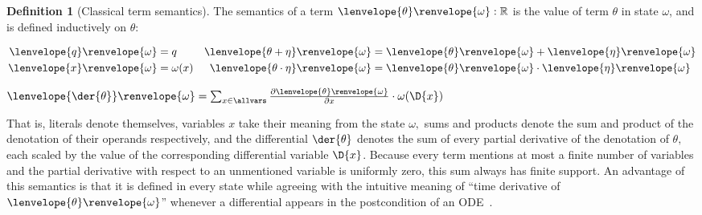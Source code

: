 \documentclass[12pt]{cmuthesis}
\theoremstyle{definition}
\newtheorem{definition}{Definition}
\theoremstyle{remark}
\newcommand{\om}{\omega}
\newcommand{\tint}[2]{\lenvelope{#1}\renvelope{#2}}
\begin{document}
\begin{definition}[Classical term semantics]\label{def:dgl-sem-term}
The semantics of a term $\tint{\theta}{\om} : \mathbb{R}$ is the value of term $\theta$ in state $\om$, and is defined inductively on $\theta$:

\begin{minipage}{0.5\textwidth}
\begin{align*}
  \tint{q}{\om} &= q      & \tint{\theta + \eta}{\om}     &= \tint{\theta}{\om} + \tint{\eta}{\om}   \\
  \tint{x}{\om} &= \om(x) & \tint{\theta \cdot \eta}{\om} &= \tint{\theta}{\om} \cdot \tint{\eta}{\om}
\end{align*}
\end{minipage}
\begin{minipage}{0.5\textwidth}
${\tint{\der{\theta}}{\om} = \sum_{x \in \allvars} \frac{\partial \tint{\theta}{\om}}{\partial x} \cdot \omega(\D{x})}$
\end{minipage}
\end{definition}
That is, literals denote themselves, variables $x$ take their meaning from the state $\om,$ sums and products denote the sum and product of the denotation of their operands respectively, and the differential $\der{\theta}$ denotes the sum of every partial derivative of the denotation of $\theta,$ each scaled by the value of the corresponding differential variable $\D{x}$.
Because every term mentions at most a finite number of variables and the partial derivative with respect to an unmentioned variable is uniformly zero, this sum always has finite support.
An advantage of this semantics is that it is defined in every state while agreeing with the intuitive meaning of ``time derivative of $\tint{\theta}{\om}$'' whenever a differential appears in the postcondition of an ODE~\cite{DBLP:journals/jar/Platzer17}.
\end{document}
